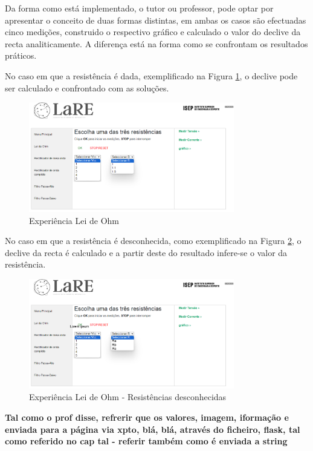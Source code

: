Da forma como está implementado, o tutor ou professor, pode optar por apresentar o conceito de duas formas distintas, em ambas os casos são efectuadas cinco medições, construido o respectivo gráfico e calculado o valor do declive da recta analiticamente. A diferença está na forma como se confrontam os resultados práticos. 

No caso em que a resistência é dada, exemplificado na Figura \ref{fig:pagohm}, o declive pode ser calculado e confrontado com as soluções.

\begin{figure}[hbtp]
	\centering
	\includegraphics[width=0.8\textwidth]{figures/ohm_escolha.png}
	\caption{Experiência Lei de Ohm}
	\label{fig:pagohm}
\end{figure}

No caso em que a resistência é desconhecida, como exemplificado na Figura \ref{fig:pagohmabc}, o declive da recta é calculado e a partir deste do resultado infere-se o valor da resistência. 

\begin{figure}[hbtp]
	\centering
	\includegraphics[width=0.8\textwidth]{figures/ohm_escolha_abc.png}
	\caption{Experiência Lei de Ohm - Resistências desconhecidas}
	\label{fig:pagohmabc}
\end{figure}

\textbf{Tal como o prof disse, refrerir que os valores, imagem, iformação e enviada para a página via xpto, blá, blá, através do ficheiro, flask, tal como referido no cap tal - referir também como é enviada a string}

